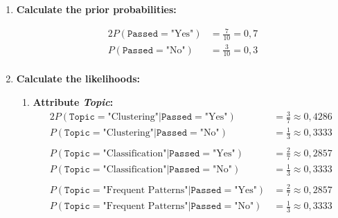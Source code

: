 \documentclass[
english,
smallborders
]{i6prcsht}
\newcommand{\PriorProbability}[2]{P(\texttt{#1}=\text{"#2"})}
\newcommand{\Likelihood}[4]{P(\texttt{#1}=\text{"#2"} | \texttt{#3}=\text{"#4"})}
\begin{document}
\begin{solution}	
	\begin{enumerate}	
		\item \textbf{Calculate the prior probabilities:}
		      
		      \begin{alignat*}{2}
			      \PriorProbability{Passed}{Yes} & = \frac{7}{10} = 0,7 \\
			      \PriorProbability{Passed}{No}  & = \frac{3}{10} = 0,3 \\
		      \end{alignat*}
		      
		\item \textbf{Calculate the likelihoods:}
		      
		      \begin{enumerate}	
			      \item \textbf{Attribute \textit{Topic}:}
			            \begin{alignat*}{2}
				            \Likelihood{Topic}{Clustering}{Passed}{Yes}        & = \frac{3}{7} \approx 0,4286 \\
				            \Likelihood{Topic}{Clustering}{Passed}{No}         & = \frac{1}{3} \approx 0,3333 \\
				                                                               &                              \\
				            \Likelihood{Topic}{Classification}{Passed}{Yes}    & = \frac{2}{7} \approx 0,2857 \\
				            \Likelihood{Topic}{Classification}{Passed}{No}     & = \frac{1}{3} \approx 0,3333 \\
				                                                               &                              \\
				            \Likelihood{Topic}{Frequent Patterns}{Passed}{Yes} & = \frac{2}{7} \approx 0,2857 \\
				            \Likelihood{Topic}{Frequent Patterns}{Passed}{No}  & = \frac{1}{3} \approx 0,3333 \\
			            \end{alignat*}
			            

\end{enumerate}
\end{enumerate}
\end{solution}
\end{document}
